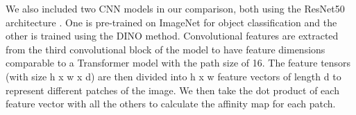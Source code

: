 \documentclass{article}
\begin{document}
We also included two CNN models in our comparison, both using the ResNet50 architecture \citep{he2016deep}. One is pre-trained on ImageNet for object classification and the other is trained using the DINO method. Convolutional features are extracted from the third convolutional block of the model to have feature dimensions comparable to a Transformer model with the path size of 16. The feature tensors (with size h x w x d) are then divided into h x w feature vectors of length d to represent different patches of the image. We then take the dot product of each feature vector with all the others to calculate the affinity map for each patch. 

\end{document}
